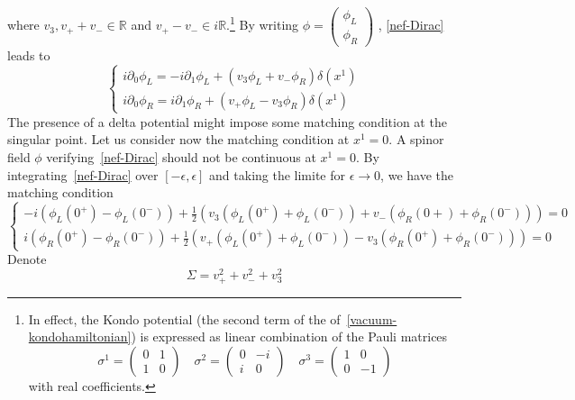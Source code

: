 where $v_3, v_+ + v_- \in \mathbb{R}$ and $ v_+ - v_-\in i \mathbb{R}$.\footnote{
In effect, the Kondo potential (the second term of the \rhs of~\cref{vacuum-kondohamiltonian}) is expressed as linear combination of the Pauli matrices
\begin{equation*}
\sigma^1 = \begin{pmatrix} 0 & 1 \\ 1 & 0 \end{pmatrix} \quad
\sigma^2 = \begin{pmatrix} 0 & -i \\ i & 0 \end{pmatrix} \quad
\sigma^3 = \begin{pmatrix} 1 & 0 \\ 0 & -1 \end{pmatrix} 
\end{equation*}
with real coefficients.
}
By writing $\phi =
\begin{pmatrix}
\phi_L \\
\phi_R
\end{pmatrix}$
, \cref{nef-Dirac} leads to
\begin{equation}
\begin{cases}
i \partial_0 \phi_L = -i\partial_1 \phi_L + (v_3 \phi_L + v_- \phi_R) \delta(x^1) \\
i \partial_0 \phi_R = i\partial_1 \phi_R + (v_+ \phi_L - v_3 \phi_R) \delta(x^1)
\end{cases}
\end{equation}
The presence of a delta potential might impose some matching condition at the singular point.
Let us consider now the matching condition at $x^1=0$.
A spinor field $\phi$ verifying~\cref{nef-Dirac} should not be continuous at $x^1 = 0$. 
By integrating~\cref{nef-Dirac} over $[-\epsilon, \epsilon]$ and taking the limite for $\epsilon \rightarrow 0$,
we have the matching condition
\begin{equation}\label{nef-matching}
\begin{cases}
-i(\phi_L(0^+) - \phi_L(0^-)) + \frac{1}{2}(v_3 (\phi_L(0^+) + \phi_L(0^-))+ v_- (\phi_R(0+) + \phi_R(0^-))) = 0 \\
i(\phi_R(0^+) - \phi_R(0^-)) + \frac{1}{2}(v_+ (\phi_L(0^+) + \phi_L(0^-)) - v_3 (\phi_R(0^+) + \phi_R(0^-))) = 0
\end{cases}
\end{equation}
Denote 
\begin{equation*}
\Sigma = v_+ ^ 2 + v_- ^ 2 + v_3 ^ 2
\end{equation*}
